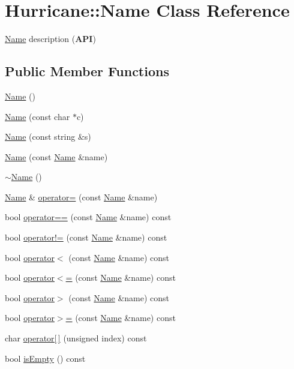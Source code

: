 \hypertarget{classHurricane_1_1Name}{\section{Hurricane\-:\-:Name Class Reference}
\label{classHurricane_1_1Name}
}


\hyperlink{classHurricane_1_1Name}{Name} description ({\bfseries A\-P\-I})  


\subsection*{Public Member Functions}
\begin{DoxyCompactItemize}
\item 
\hyperlink{classHurricane_1_1Name_a42636ecb0d4d7d03eb881420a244038b}{Name} ()
\item 
\hyperlink{classHurricane_1_1Name_a754d54199d54c5e4568421c89f0682cb}{Name} (const char $\ast$c)
\item 
\hyperlink{classHurricane_1_1Name_a446df795ebe2e641710696bf775eb491}{Name} (const string \&s)
\item 
\hyperlink{classHurricane_1_1Name_a56ffee3e75dc343c7ec8b61102c1d3a2}{Name} (const \hyperlink{classHurricane_1_1Name}{Name} \&name)
\item 
\hyperlink{classHurricane_1_1Name_a1ce605ce16980334f93d7cc278984842}{$\sim$\-Name} ()
\item 
\hyperlink{classHurricane_1_1Name}{Name} \& \hyperlink{classHurricane_1_1Name_adcd165de286782c011acc31727adb4a1}{operator=} (const \hyperlink{classHurricane_1_1Name}{Name} \&name)
\item 
bool \hyperlink{classHurricane_1_1Name_a72adde3e413d5f1d81bef8515f47c2f9}{operator==} (const \hyperlink{classHurricane_1_1Name}{Name} \&name) const 
\item 
bool \hyperlink{classHurricane_1_1Name_a2501c034f9d23eb91dce7f02541a7914}{operator!=} (const \hyperlink{classHurricane_1_1Name}{Name} \&name) const 
\item 
bool \hyperlink{classHurricane_1_1Name_a2cf99395959a5fed2855bdb7533eb357}{operator$<$} (const \hyperlink{classHurricane_1_1Name}{Name} \&name) const 
\item 
bool \hyperlink{classHurricane_1_1Name_a00999aa35c0cf7294893f3c9c3654b83}{operator$<$=} (const \hyperlink{classHurricane_1_1Name}{Name} \&name) const 
\item 
bool \hyperlink{classHurricane_1_1Name_abd0d9962013e16e9b833d5520107bb7b}{operator$>$} (const \hyperlink{classHurricane_1_1Name}{Name} \&name) const 
\item 
bool \hyperlink{classHurricane_1_1Name_a8bb148812eed80cd3884b9921c6e507b}{operator$>$=} (const \hyperlink{classHurricane_1_1Name}{Name} \&name) const 
\item 
char \hyperlink{classHurricane_1_1Name_adbe38ab38617010235f6a004bdb8bd23}{operator\mbox{[}$\,$\mbox{]}} (unsigned index) const 
\item 
bool \hyperlink{classHurricane_1_1Name_aeea5ab28f143d09b98c03dc04da95c0a}{is\-Empty} () const 
\end{DoxyCompactItemize}


